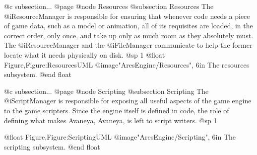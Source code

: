 @c subsection...
@page 
@node Resources
@subsection Resources
The @i{ResourceManager} is responsible for ensuring that whenever code needs a piece of game data, such as a model or animation, all of its requisites are loaded, in the correct order, only once, and take up only as much room as they absolutely must. The @i{ResourceManager} and the @i{FileManager} communicate to help the former locate what it needs physically on disk.
@sp 1
@float Figure,Figure:ResourcesUML
@image{"AresEngine/Resources", 6in}
The resources subsystem.
@end float

@c subsection...
@page 
@node Scripting
@subsection Scripting
The @i{ScriptManager} is responsible for exposing all useful aspects of the game engine to the game scripters. Since the engine itself is defined in code, the role of defining what makes Avaneya, Avaneya, is left to script writers.
@sp 1

@float Figure,Figure:ScriptingUML
@image{"AresEngine/Scripting", 6in}
The scripting subsystem.
@end float


